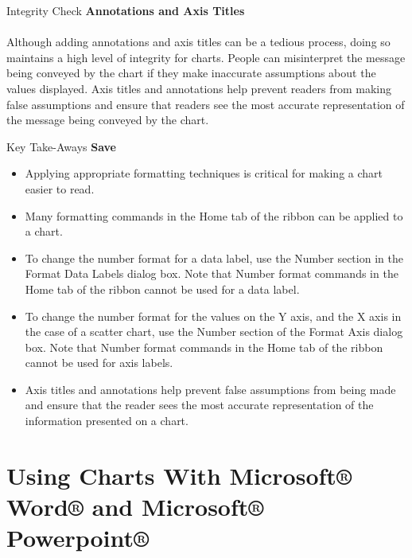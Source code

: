 \begin{center}
	\begin{infobox}{Integrity Check}
		\textbf{Annotations and Axis Titles}
		\\
		\\
		Although adding annotations and axis titles can be a tedious process, doing so maintains a high level of integrity for charts. People can misinterpret the message being conveyed by the chart if they make inaccurate assumptions about the values displayed. Axis titles and annotations help prevent readers from making false assumptions and ensure that readers see the most accurate representation of the message being conveyed by the chart.		
	\end{infobox}
\end{center}

\begin{center}
	\begin{tkwbox}{Key Take-Aways}
		\textbf{Save}
		\\
		\begin{itemize}
			\setlength{\itemsep}{0pt}
			\setlength{\parskip}{0pt}
			\setlength{\parsep}{0pt}

			\item Applying appropriate formatting techniques is critical for making a chart easier to read.
			\item Many formatting commands in the Home tab of the ribbon can be applied to a chart.
			\item To change the number format for a data label, use the Number section in the Format Data Labels dialog box. Note that Number format commands in the Home tab of the ribbon cannot be used for a data label.
			\item To change the number format for the values on the Y axis, and the X axis in the case of a scatter chart, use the Number section of the Format Axis dialog box. Note that Number format commands in the Home tab of the ribbon cannot be used for axis labels.
			\item Axis titles and annotations help prevent false assumptions from being made and ensure that the reader sees the most accurate representation of the information presented on a chart.
			
		\end{itemize}
	\end{tkwbox}
\end{center}

\section{Using Charts With Microsoft® Word® and Microsoft® Powerpoint®}

